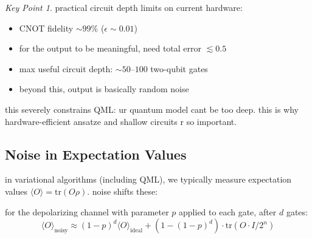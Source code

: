 \documentclass[11pt,a4paper]{article}
\theoremstyle{definition}
\theoremstyle{remark}
\newtheorem*{keypoint}{Key Point}
\begin{document}
\begin{center}
\end{center}

\begin{keypoint}
practical circuit depth limits on current hardware:
\begin{itemize}
    \item CNOT fidelity $\sim 99\%$ ($\epsilon \sim 0.01$)
    \item for the output to be meaningful, need total error $\lesssim 0.5$
    \item max useful circuit depth: $\sim 50$--$100$ two-qubit gates
    \item beyond this, output is basically random noise
\end{itemize}
this severely constrains QML: ur quantum model cant be too deep. this is why hardware-efficient ansatze and shallow circuits r so important.
\end{keypoint}

\subsection{Noise in Expectation Values}

in variational algorithms (including QML), we typically measure expectation values $\langle O \rangle = \text{tr}(O\rho)$. noise shifts these:

for the depolarizing channel with parameter $p$ applied to each gate, after $d$ gates:
\[
\langle O \rangle_{\text{noisy}} \approx (1 - p)^d \langle O \rangle_{\text{ideal}} + (1 - (1-p)^d) \cdot \text{tr}(O \cdot I/2^n)
\]
\end{document}
